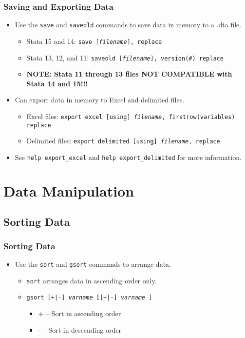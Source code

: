 \documentclass{beamer}
\begin{document}
\begin{frame}
	\frametitle{Saving and Exporting Data}
		\begin{itemize}
			\item Use the \texttt{save} and \texttt{saveold} commands to save data in memory to a .dta file.
				\begin{itemize}
					\item Stata 15 and 14: \texttt{save [\textit{filename}], replace}
					\item Stata 13, 12, and 11: \texttt{saveold [\textit{filename}], version(\#) replace}
					\item \textbf{NOTE: Stata 11 through 13 files NOT COMPATIBLE with Stata 14 and 15!!!}
				\end{itemize}
			\item Can export data in memory to Excel and delimited files.
			\begin{itemize}
				\item Excel files: \texttt{export excel [using] \textit{filename}, firstrow(variables) replace}
				\item Delimited files: \texttt{export delimited [using] \textit{filename}, replace}
			\end{itemize}
			\item See \texttt{help export\_{excel}} and \texttt{help export\_{delimited}} for more information.
		\end{itemize}
\end{frame}

\section{Data Manipulation}
\subsection{Sorting Data}

\begin{frame}
	\frametitle{Sorting Data}
		\begin{itemize}
			\item Use the \texttt{sort} and \texttt{gsort} commands to arrange data.
				\begin{itemize}
					\item \texttt{sort} arranges data in ascending order only.
					\item \texttt{gsort [+|-] \textit{varname} [[+|-] \textit{varname} \textellipsis]}
						\begin{itemize}
							\item + -- Sort in ascending order
							\item - -- Sort in descending order
						\end{itemize}
				\end{itemize}
		\end{itemize}
\end{frame}
\end{document}
